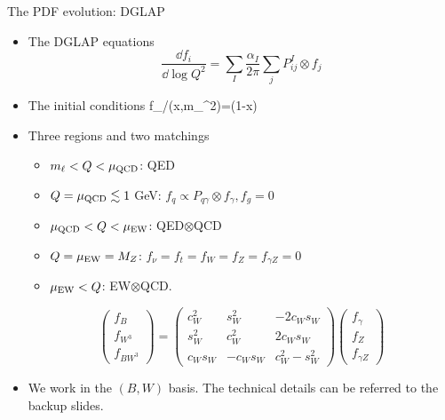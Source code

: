 \documentclass[aspectratio=169]{beamer}
\begin{document}
\begin{frame}{The PDF evolution: DGLAP}
	\begin{itemize}
		\item The DGLAP equations
		\begin{equation}\nonumber
		\frac{\dd f_{i}}{\dd\log Q^2}=\sum_{I}\frac{\alpha_I}{2\pi}\sum_{j}P^{I}_{ij}\otimes f_j
		\end{equation}
		\item The initial conditions
		\beq\nonumber
		f_{\ell/\ell}(x,m_{\ell}^2)=\delta(1-x)
		\eeq	
		\item Three regions and two matchings
		\begin{itemize}
			\item  $m_{\ell}<Q<\mu_{\textrm{QCD}}$: QED 
			\item $Q=\mu_{\textrm{QCD}}\lesssim1$ GeV: $f_{q}\propto P_{q\gamma}\otimes f_{\gamma}, f_{g}=0$	
			\item $\mu_{\textrm{QCD}}<Q<\mu_{\textrm{EW}}$: QED$\otimes$QCD
			\item $Q=\mu_{\textrm{EW}}=M_Z$: $f_{\nu}=f_{t}=f_{W}=f_{Z}=f_{\gamma Z}=0$	
			\item $\mu_{\textrm{EW}}<Q$: EW$\otimes$QCD.
		\end{itemize}
		\begin{equation}\nonumber
		\begin{pmatrix}
		f_B\\ f_{W^3}\\ f_{BW^3}
		\end{pmatrix}=\begin{pmatrix}
		c_W^2 & s_W^2  & -2c_W s_W\\
		s_W^2 & c_W^2  & 2c_W s_W\\
		c_W s_W & -c_W s_W & c_W^2-s_W^2
		\end{pmatrix}
		\begin{pmatrix}
		f_\gamma  \\ f_Z\\ f_{\gamma Z}
		\end{pmatrix}\nonumber
		\end{equation}			
		\item  We work in the $(B,W)$ basis. The technical details can be referred to the backup slides.
		\end{itemize}
\end{frame}
\end{document}
